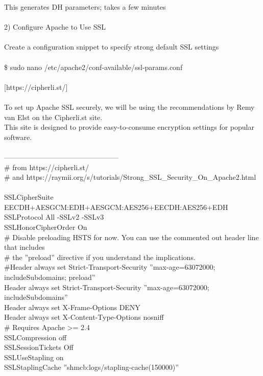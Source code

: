 \documentclass[10pt,a4paper]{article}
\begin{document}
{{{{{{{{{{{{{{{{This generates DH parameters; takes a few minutes\\
\\
2) Configure Apache to Use SSL\\
\\
Create a configuration snippet to specify strong default SSL settings\\
\\
\$ sudo nano /etc/apache2/conf-available/ssl-params.conf}{\large \\
\\
[https://cipherli.st/}{\large ]\\
\\
To set up Apache SSL securely, we will be using the recommendations by Remy van Elst on the Cipherli.st site. \\
This site is designed to provide easy-to-consume encryption settings for popular software.\\
\\
------------------------------------------------\\
\# from https://cipherli.st/}{\large \\
\# and https://raymii.org/s/tutorials/Strong\_SSL\_Security\_On\_Apache2.html}{\large \\
\\
SSLCipherSuite EECDH+AESGCM:EDH+AESGCM:AES256+EECDH:AES256+EDH\\
SSLProtocol All -SSLv2 -SSLv3\\
SSLHonorCipherOrder On\\
\# Disable preloading HSTS for now.  You can use the commented out header line that includes\\
\# the ''preload'' directive if you understand the implications.\\
\#Header always set Strict-Transport-Security ''max-age=63072000; includeSubdomains; preload''\\
Header always set Strict-Transport-Security ''max-age=63072000; includeSubdomains''\\
Header always set X-Frame-Options DENY\\
Header always set X-Content-Type-Options nosniff\\
\# Requires Apache >= 2.4\\
SSLCompression off \\
SSLSessionTickets Off\\
SSLUseStapling on \\
SSLStaplingCache ''shmcb:logs/stapling-cache(150000)''\\
}}}}}}}}}}}}}}}}
\end{document}
